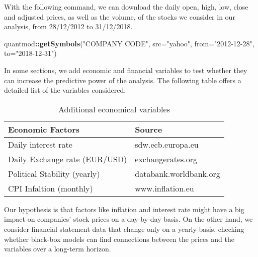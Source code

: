 \documentclass[
  11pt,
]{article}
\newenvironment{Shaded}{\begin{snugshade}}{\end{snugshade}}
\newcommand{\DataTypeTok}[1]{\textcolor[rgb]{0.13,0.29,0.53}{#1}}
\newcommand{\KeywordTok}[1]{\textcolor[rgb]{0.13,0.29,0.53}{\textbf{#1}}}
\newcommand{\NormalTok}[1]{#1}
\newcommand{\OperatorTok}[1]{\textcolor[rgb]{0.81,0.36,0.00}{\textbf{#1}}}
\newcommand{\StringTok}[1]{\textcolor[rgb]{0.31,0.60,0.02}{#1}}
\begin{document}
With the following command, we can download the daily open, high, low,
close and adjusted prices, as well as the volume, of the stocks we
consider in our analysis, from 28/12/2012 to 31/12/2018.

\begin{Shaded}
\begin{Highlighting}[]
\NormalTok{quantmod}\OperatorTok{::}\KeywordTok{getSymbols}\NormalTok{(}\StringTok{"COMPANY CODE"}\NormalTok{, }\DataTypeTok{src=}\StringTok{"yahoo"}\NormalTok{, }
                     \DataTypeTok{from=}\StringTok{"2012-12-28"}\NormalTok{, }\DataTypeTok{to=}\StringTok{"2018-12-31"}\NormalTok{)}
\end{Highlighting}
\end{Shaded}

In some sections, we add economic and financial variables to test
whether they can increase the predictive power of the analysis. The
following table offers a detailed list of the variables considered.

\begin{table}[H]

\caption{\label{tab:first_half}Additional economical variables}
\centering
\begin{tabular}[t]{ll}
\toprule
Economic
Factors & Source\\
\midrule
Daily interest rate & sdw.ecb.europa.eu\\
Daily Exchange rate
(EUR/USD) & exchangerates.org\\
Political Stability (yearly) & databank.worldbank.org\\
CPI Infaltion (monthly) & www.inflation.eu\\
\bottomrule
\end{tabular}
\end{table}

Our hypothesis is that factors like inflation and interest rate might
have a big impact on companies' stock prices on a day-by-day basis. On
the other hand, we consider financial statement data that change only on
a yearly basis, checking whether black-box models can find connections
between the prices and the variables over a long-term horizon.
\end{document}
